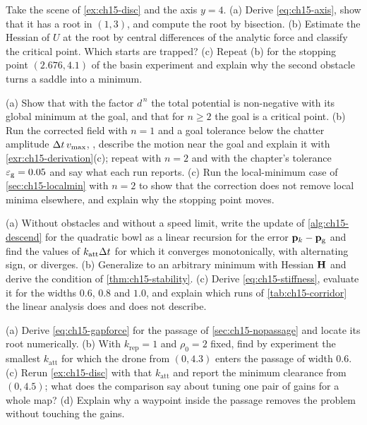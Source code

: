\begin{exercise}[\difficulty{2}]
\label{exr:ch15-equilibrium}
Take the scene of \cref{ex:ch15-disc} and the axis $y = 4$. (a) Derive
\cref{eq:ch15-axis}, show that it has a root in $(1, 3)$, and compute the
root by bisection. (b) Estimate the Hessian of $U$ at the root by
central differences of the analytic force and classify the critical point.
Which starts are trapped? (c) Repeat (b) for the stopping point $(2.676,
4.1)$ of the basin experiment and explain why the second obstacle turns a
saddle into a minimum.
\end{exercise}

\begin{exercise}[\difficulty{2}]
\label{exr:ch15-gnron}
(a) Show that with the factor $d^{\,n}$ the total potential is
non-negative with its global minimum at the goal, and that for $n \ge 2$ the
goal is a critical point. (b) Run the corrected field with $n = 1$ and a goal
tolerance below the chatter amplitude $\Delta t\, v_{\max}$,
,
describe the motion near the goal and explain it with
\cref{exr:ch15-derivation}(c); repeat with $n = 2$ and with the chapter's
tolerance $\varepsilon_{\mathrm{g}} = 0.05$ and say what each run reports.
(c) Run the local-minimum case of \cref{sec:ch15-localmin} with $n = 2$ to
show that the correction does not remove local minima elsewhere, and explain
why the stopping point moves.
\end{exercise}

\begin{exercise}[\difficulty{2}]
\label{exr:ch15-stability}
(a) Without obstacles and without a speed limit, write the update of
\cref{alg:ch15-descend} for the quadratic bowl as a linear recursion for the
error $\mathbf{p}_k - \mathbf{p}_{\mathrm{g}}$ and find the values of $k_{\mathrm{att}}\Delta t$
for which it converges monotonically, with alternating sign, or diverges. (b) Generalize to an arbitrary minimum with
Hessian $\mathbf{H}$ and derive the condition of \cref{thm:ch15-stability}.
(c) Derive \cref{eq:ch15-stiffness}, evaluate it for the widths $0.6$, $0.8$
and $1.0$, and explain which runs of \cref{tab:ch15-corridor} the linear
analysis does and does not describe.
\end{exercise}

\begin{exercise}[\difficulty{2}]
\label{exr:ch15-nopassage}
(a) Derive \cref{eq:ch15-gapforce} for the passage of
\cref{sec:ch15-nopassage} and locate its root numerically. (b) With
$k_{\mathrm{rep}} = 1$ and $\rho_0 = 2$ fixed, find by experiment the
smallest $k_{\mathrm{att}}$ for which the drone from $(0, 4.3)$ enters the
passage of width $0.6$. (c) Rerun \cref{ex:ch15-disc} with that
$k_{\mathrm{att}}$ and report the minimum clearance from $(0, 4.5)$; what
does the comparison say about tuning one pair of gains for a whole map?
(d) Explain why a waypoint inside the passage removes the problem without
touching the gains.
\end{exercise}

